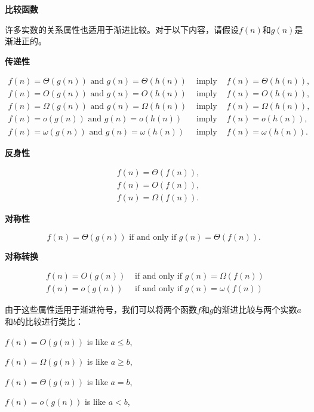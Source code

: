 \documentclass[lang=cn,newtx,10pt,scheme=chinese]{elegantbook}
\begin{document}
\textbf{比较函数}

许多实数的关系属性也适用于渐进比较。对于以下内容，请假设$f(n)$和$g(n)$是渐进正的。

\textbf{传递性}

\begin{equation*}
\begin{array}{llll}
f(n)=\Theta(g(n)) \text { and } g(n)=\Theta(h(n)) & \text { imply } & f(n)=\Theta(h(n)), \\
f(n)=O(g(n)) \text { and } g(n)=O(h(n)) & \text { imply } & f(n)=O(h(n)), \\
f(n)=\Omega(g(n)) \text { and } g(n)=\Omega(h(n)) & \text { imply } & f(n)=\Omega(h(n)), \\
f(n)=o(g(n)) \text { and } g(n)=o(h(n)) & \text { imply } & f(n)=o(h(n)), \\
f(n)=\omega(g(n)) \text { and } g(n)=\omega(h(n)) & \text { imply } & f(n)=\omega(h(n)) .
\end{array}
\end{equation*}


\textbf{反身性}

\begin{equation*}
\begin{aligned}
& f(n)=\Theta(f(n)), \\
& f(n)=O(f(n)), \\
& f(n)=\Omega(f(n)) .
\end{aligned}
\end{equation*}

\textbf{对称性}

$$
f(n)=\Theta(g(n)) \text { if and only if } g(n)=\Theta(f(n)) \text {. }
$$

\textbf{对称转换}

\begin{equation*}
\begin{array}{ll}
f(n)=O(g(n)) & \text { if and only if } g(n)=\Omega(f(n)) \\
f(n)=o(g(n)) & \text { if and only if } g(n)=\omega(f(n))
\end{array}
\end{equation*}

由于这些属性适用于渐进符号，我们可以将两个函数$f$和$g$的渐进比较与两个实数$a$和$b$的比较进行类比：

$f(n)=O(g(n))$ is like $a \leq b$,

$f(n)=\Omega(g(n))$ is like $a \geq b$,

$f(n)=\Theta(g(n))$ is like $a=b$,

$f(n)=o(g(n))$ is like $a<b$,
\end{document}
